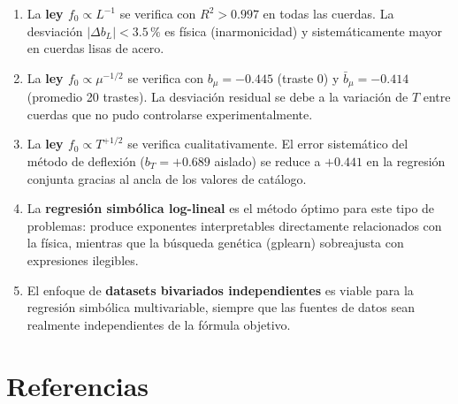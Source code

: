 \documentclass[12pt,a4paper]{article}
\begin{document}
\begin{enumerate}
  \item La \textbf{ley $f_0 \propto L^{-1}$} se verifica con $R^2 > 0.997$
    en todas las cuerdas. La desviación $|\Delta b_L| < 3.5\,\%$ es física
    (inarmonicidad) y sistemáticamente mayor en cuerdas lisas de acero.

  \item La \textbf{ley $f_0 \propto \mu^{-1/2}$} se verifica con
    $b_\mu = -0.445$ (traste 0) y $\bar{b}_\mu = -0.414$ (promedio 20
    trastes). La desviación residual se debe a la variación de $T$ entre
    cuerdas que no pudo controlarse experimentalmente.

  \item La \textbf{ley $f_0 \propto T^{+1/2}$} se verifica cualitativamente.
    El error sistemático del método de deflexión ($b_T = +0.689$ aislado)
    se reduce a $+0.441$ en la regresión conjunta gracias al ancla de los
    valores de catálogo.

  \item La \textbf{regresión simbólica log-lineal} es el método óptimo para
    este tipo de problemas: produce exponentes interpretables directamente
    relacionados con la física, mientras que la búsqueda genética (gplearn)
    sobreajusta con expresiones ilegibles.

  \item El enfoque de \textbf{datasets bivariados independientes} es viable
    para la regresión simbólica multivariable, siempre que las fuentes de
    datos sean realmente independientes de la fórmula objetivo.
\end{enumerate}

\section*{Referencias}
\end{document}
